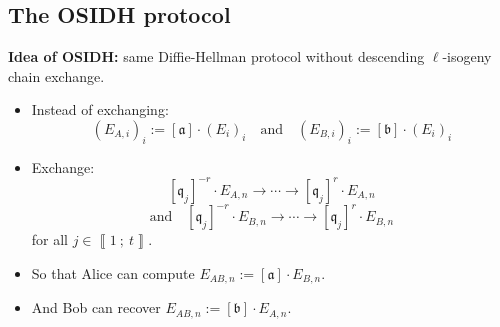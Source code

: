 \documentclass[10pt]{beamer}
\theoremstyle{plain}
\theoremstyle{definition}
\newcommand{\mO}{\mathcal{O}}
\renewcommand{\i}[2]{\left\llbracket #1~;~#2\right\rrbracket}
\renewcommand{\(}{\left(}
\renewcommand{\)}{\right)}
\newcommand{\mf}[1]{\mathfrak{#1}}
\newcommand{\mfq}{\mathfrak{q}}
\begin{document}



\subsection{The OSIDH protocol}

\begin{frame}
\textbf{Idea of OSIDH:} same Diffie-Hellman protocol without descending $\ell$-isogeny chain exchange.

\vspace{0.5cm}

\begin{itemize}
\item Instead of exchanging:
\[(E_{A,i})_{i}:=[\mf{a}]\cdot (E_i)_{i} \quad \mbox{and} \quad (E_{B,i})_{i}:=[\mf{b}]\cdot (E_i)_{i}\]

\pause 
\item Exchange:
\[[\mfq_j]^{-r}\cdot E_{A,n}\longrightarrow \cdots\longrightarrow [\mfq_j]^{r}\cdot E_{A,n}\]
\[\mbox{and} \quad [\mfq_j]^{-r}\cdot E_{B,n}\longrightarrow \cdots\longrightarrow [\mfq_j]^{r}\cdot E_{B,n}\]
for all $j\in\i{1}{t}$.

\pause
\item So that Alice can compute $E_{AB,n}:=[\mf{a}]\cdot E_{B,n}$.
\item And Bob can recover $E_{AB,n}:=[\mf{b}]\cdot E_{A,n}$.
\end{itemize}

\end{frame}
\end{document}
